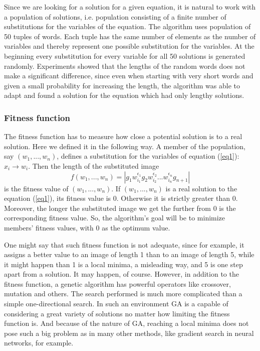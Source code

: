 \documentclass{article}
\begin{document}
Since we are looking for a solution for a given equation, it is
natural to work with a population of solutions, i.e. population
consisting of a finite number of substitutions for the variables of
the equation. The algorithm uses population of 50 tuples of
words. Each tuple has the same number of elements as the number of
variables and thereby represent one possible substitution for the
variables. At the beginning every substitution for every variable for
all 50 solutions is generated randomly. Experiments showed that the
lengths of the random words does not make a significant difference,
since even when starting with very short words and given a small
probability for increasing the length, the algorithm was able to adapt
and found a solution for the equation which had only lengthy
solutions.

    \subsubsection{Fitness function}

The fitness function has to measure how close a potential solution is
to a real solution. Here we defined it in the following way. A member
of the population, say $(w_1,...,w_n)$, defines a substitution for the
variables of equation (\ref{eq1}): $x_i \rightarrow w_i$. Then 
the length of the substituted image
\[
f(w_1,...,w_n) = | g_1 w_{i_1}^{\epsilon_1} g_2 w_{i_2}^{\epsilon_2} ... w_{i_n}^{\epsilon_n} g_{n+1} |
\]
is the fitness value of $(w_1,...,w_n)$. If $(w_1,...,w_n)$ is a real
solution to the equation (\ref{eq1}), its fitness value is 0. Otherwise
it is strictly greater than 0. Moreover, the longer the substituted
image we get the further from 0 is the corresponding fitness value.
So, the algorithm's goal will be to minimize members' fitness values,
with 0 as the optimum value.

One might say that such fitness function is not adequate, since for
example, it assigns a better value to an image of length 1 than to an
image of length 5, while it might happen than 1 is a local minima, a
misleading way, and 5 is one step apart from a solution. It may
happen, of course.  However, in addition to the fitness function, a
genetic algorithm has powerful operators like crossover, mutation and
others.  The search performed is much more complicated than a simple
one-directional search. In such an environment GA is a capable of
considering a great variety of solutions no matter how limiting the
fitness function is. And because of the nature of GA, reaching a local
minima does not pose such a big problem as in many other methods, like
gradient search in neural networks, for example.
\end{document}
